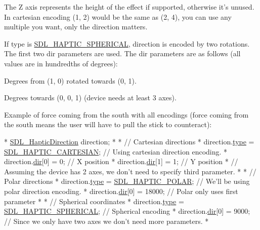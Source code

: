 The Z axis represents the height of the effect if supported, otherwise it's unused. In cartesian encoding (1, 2) would be the same as (2, 4), you can use any multiple you want, only the direction matters.

If type is \hyperlink{_s_d_l__haptic_8h_a1fcf7cb0eaf3c39b16ba266054e25aff}{S\-D\-L\-\_\-\-H\-A\-P\-T\-I\-C\-\_\-\-S\-P\-H\-E\-R\-I\-C\-A\-L}, direction is encoded by two rotations. The first two {\ttfamily dir} parameters are used. The {\ttfamily dir} parameters are as follows (all values are in hundredths of degrees)\-:
\begin{DoxyItemize}
\item Degrees from (1, 0) rotated towards (0, 1).
\item Degrees towards (0, 0, 1) (device needs at least 3 axes).
\end{DoxyItemize}

Example of force coming from the south with all encodings (force coming from the south means the user will have to pull the stick to counteract)\-: 
\begin{DoxyCode}
*  \hyperlink{struct_s_d_l___haptic_direction}{SDL\_HapticDirection} direction;
*
*  \textcolor{comment}{// Cartesian directions}
*  direction.\hyperlink{struct_s_d_l___haptic_direction_acd6830ad68c4ba2af16057fa418087cc}{type} = \hyperlink{_s_d_l__haptic_8h_af8b2430a363a968de2a5b64c8f663d3b}{SDL\_HAPTIC\_CARTESIAN}; \textcolor{comment}{// Using cartesian direction encoding.}
*  direction.\hyperlink{struct_s_d_l___haptic_direction_a6cebd8118a3e61e36bd0c503ae020362}{dir}[0] = 0; \textcolor{comment}{// X position}
*  direction.\hyperlink{struct_s_d_l___haptic_direction_a6cebd8118a3e61e36bd0c503ae020362}{dir}[1] = 1; \textcolor{comment}{// Y position}
*  \textcolor{comment}{// Assuming the device has 2 axes, we don't need to specify third parameter.}
*
*  \textcolor{comment}{// Polar directions}
*  direction.\hyperlink{struct_s_d_l___haptic_direction_acd6830ad68c4ba2af16057fa418087cc}{type} = \hyperlink{_s_d_l__haptic_8h_acdc35e97e5525472054a67b76e518f3b}{SDL\_HAPTIC\_POLAR}; \textcolor{comment}{// We'll be using polar direction encoding.}
*  direction.\hyperlink{struct_s_d_l___haptic_direction_a6cebd8118a3e61e36bd0c503ae020362}{dir}[0] = 18000; \textcolor{comment}{// Polar only uses first parameter}
*
*  \textcolor{comment}{// Spherical coordinates}
*  direction.\hyperlink{struct_s_d_l___haptic_direction_acd6830ad68c4ba2af16057fa418087cc}{type} = \hyperlink{_s_d_l__haptic_8h_a1fcf7cb0eaf3c39b16ba266054e25aff}{SDL\_HAPTIC\_SPHERICAL}; \textcolor{comment}{// Spherical encoding}
*  direction.\hyperlink{struct_s_d_l___haptic_direction_a6cebd8118a3e61e36bd0c503ae020362}{dir}[0] = 9000; \textcolor{comment}{// Since we only have two axes we don't need more parameters.}
*  
\end{DoxyCode}


